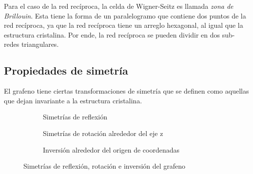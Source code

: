 Para el caso de la red recíproca, la celda de Wigner-Seitz es llamada \emph{zona de Brillouin}. Esta tiene la forma de un paralelogramo que contiene dos puntos de la red recíproca, ya que la red recíproca tiene un arreglo hexagonal, al igual que la estructura cristalina. Por ende, la red recíproca se pueden dividir en dos sub-redes triangulares.
\subsection{Propiedades de simetría}
El grafeno tiene ciertas transformaciones de simetría que se definen como aquellas que dejan invariante a la estructura cristalina. 
\begin{figure}[!httb]
    \centering
    \begin{subfigure}[b]{0.3\linewidth}
        \centering
        
        \caption{Simetrías de reflexión\\\hfill}
        \label{fig:twofold}
    \end{subfigure}
    \hfill
    \begin{subfigure}[b]{0.3\linewidth}
        \centering
        
        \caption{Simetrías de rotación alrededor del eje z}
        \label{fig:rotation}
    \end{subfigure}
    \hfill
    \begin{subfigure}[b]{0.3\linewidth}
        \centering
        
        \caption{Inversión alrededor del origen de coordenadas}
        \label{fig:inversion}
    \end{subfigure}
    \caption{Simetrías de reflexión, rotación e inversión del grafeno}
\end{figure}

